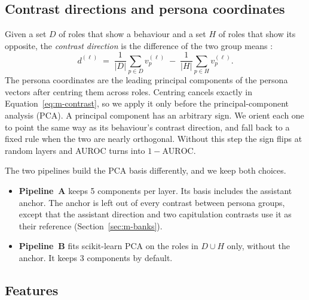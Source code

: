 \subsection{Contrast directions and persona coordinates}
\label{sec:m-coords}

Given a set $D$ of roles that show a behaviour and a set $H$ of roles that show its opposite, the \emph{contrast direction} is the difference of the two group means \parencite[p.~3, Eq.~4]{mahadik2026persona}:
\begin{equation}
  d^{(\ell)} \;=\; \frac{1}{|D|}\sum_{p\in D} v_p^{(\ell)} \;-\; \frac{1}{|H|}\sum_{p\in H} v_p^{(\ell)} .
  \label{eq:m-contrast}
\end{equation}
The persona coordinates are the leading principal components of the persona vectors after centring them across roles. Centring cancels exactly in Equation~\ref{eq:m-contrast}, so we apply it only before the principal-component analysis (PCA). %
A principal component has an arbitrary sign. We orient each one to point the same way as its behaviour's contrast direction, and fall back to a fixed rule when the two are nearly orthogonal. %
Without this step the sign flips at random layers and AUROC turns into $1-\text{AUROC}$.

The two pipelines build the PCA basis differently, and we keep both choices.
\begin{itemize}
\item \textbf{Pipeline~A} keeps 5 components per layer. %
Its basis includes the assistant anchor. The anchor is left out of every contrast between persona groups, except that the assistant direction and two capitulation contrasts use it as their reference (Section~\ref{sec:m-banks}). %
\item \textbf{Pipeline~B} fits scikit-learn PCA on the roles in $D\cup H$ only, without the anchor. It keeps 3 components by default. %
\end{itemize}

\subsection{Features}
\label{sec:m-features}

